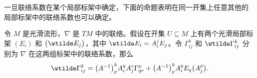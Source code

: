 \documentclass[fontset=none]{Notes}
\begin{document}
一旦联络系数在某个局部标架中确定，下面的命题表明在同一开集上任意其他的
局部标架中的联络系数也可以确定。

\begin{proposition}[联络系数的变换法则]
  令 $M$ 是光滑流形，$\nabla$ 是 $TM$ 中的联络。假设在开集 $U\subseteq M$
  上有两个光滑局部标架 $(E_i)$ 和 $\bigl(\wtilde E_j\bigr)$，其中
  $\wtilde E_i=A_i^jE_j$。令 $\Gamma_{ij}^k$ 和 $\wtilde\Gamma_{ij}^k$
  分别为 $\nabla$ 在这两组标架中的联络系数，那么 
  \begin{equation}
    \wtilde \Gamma_{ij}^k=\bigl(A^{-1}\bigr)_p^kA_i^qA_j^r\Gamma_{qr}^p
    +\bigl(A^{-1}\bigr)_p^kA_i^qE_q\bigl(A_j^p\bigr).
  \end{equation}
\end{proposition}
\end{document}
